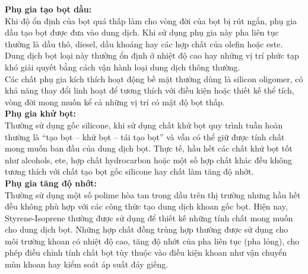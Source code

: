 \documentclass[12pt,a4paper]{article}
\begin{document}
	\textbf{Phụ gia tạo bọt dầu:}\\
	Khi độ ổn định của bọt quá thấp làm cho vòng đời của bọt bị rút ngắn, phụ gia dầu tạo bọt được đưa vào dung dịch. Khi sử dụng phụ gia này pha liên tục thường là dầu thô, diesel, dầu khoáng hay các hợp chất của olefin hoặc este. Dung dịch bọt loại này thường ổn định ở nhiệt độ cao hay những vị trí phức tạp khó giải quyết bằng cách vận hành loại dung dịch thông thường.\\
	Các chất phụ gia kích thích hoạt động bề mặt thường dùng là silicon oligomer, có khả năng thay đổi linh hoạt để tương thích với điều kiện hoặc thiết kế thể tích, vòng đời mong muốn kể cả những vị trí có mật độ bọt thấp.\\
	\textbf{Phụ gia khử bọt:}\\
	Thường sử dụng gốc silicone, khi sử dụng chất khử bọt quy trình tuần hoàn thường là “tạo bọt – khử bọt – tái tạo bọt” và vẫn có thể giữ được tính chất mong muốn ban đầu của dung dịch bọt. Thực tế, hầu hết các chất khử bọt tốt như alcohols, ete, hợp chất hydrocarbon hoặc một số hợp chất khác đều không tương thích với chất tạo bọt gốc silicone hay chất làm tăng độ nhớt.\\
	\textbf{Phụ gia tăng độ nhớt:}\\
	Thường sử dụng một số polime hòa tan trong dầu trên thị trường nhưng hầu hết đều không phù hợp với các công thức tạo dung dịch khoan gốc bọt. Hiện nay, Styrene-Isoprene thường được sử dụng để thiết kế những tính chất mong muốn cho dung dịch bọt. Những hợp chất đồng trùng hợp thường được sử dụng cho môi trường khoan có nhiệt độ cao, tăng độ nhớt của pha liên tục (pha lỏng), cho phép điều chỉnh tính chất bọt tùy thuộc vào điều kiện khoan như vận chuyển mùn khoan hay kiểm soát áp suất đáy giếng.
\end{document}
